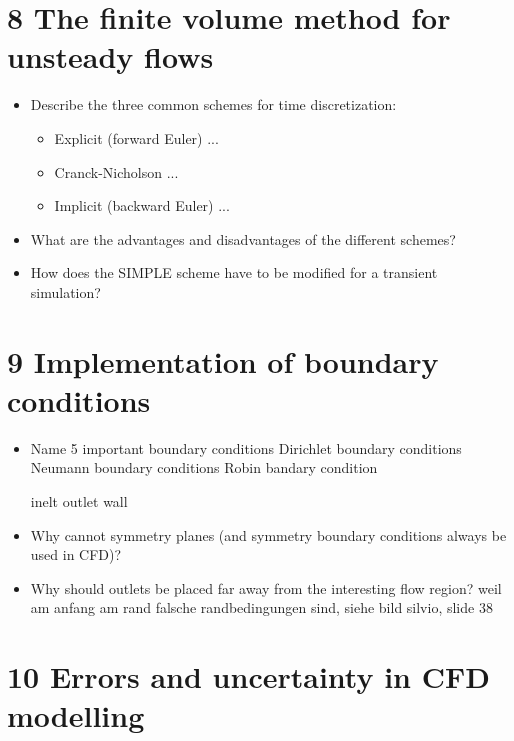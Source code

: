 \documentclass[a4paper]{scrartcl}
\begin{document}
\section{8 The finite volume method for unsteady flows}
\begin{itemize}
\item Describe the three common schemes for time discretization:
\begin{itemize}
\item Explicit (forward Euler)
...

\item Cranck-Nicholson
...

\item Implicit (backward Euler)
...

\end{itemize}
\item What are the advantages and disadvantages of the different schemes?


\item How does the SIMPLE scheme have to be modified for a transient simulation?



\end{itemize}





\section{9 Implementation of boundary conditions}
\begin{itemize}

\item Name 5 important boundary conditions
Dirichlet boundary conditions
Neumann boundary conditions
Robin bandary  condition


inelt
outlet
wall



\item Why cannot symmetry planes (and symmetry boundary conditions always be used in 
CFD)?
\item Why should outlets be placed far away from the interesting flow region?
weil am anfang am rand falsche randbedingungen sind, siehe bild silvio, slide 38


\end{itemize}


\section{10 Errors and uncertainty in CFD modelling}
\end{document}

